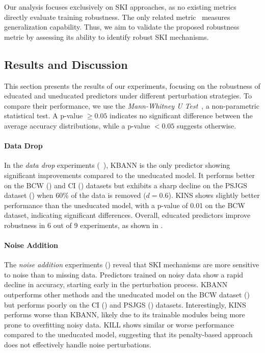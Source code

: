 %
Our analysis focuses exclusively on \gls{SKI} approaches, as no existing metrics directly evaluate training robustness.
%
The only related metric~\cite{RudenGB23} measures generalization capability.
%
Thus, we aim to validate the proposed robustness metric by assessing its ability to identify robust \gls{SKI} mechanisms.


\subsection{Results and Discussion}\label{subsec:empirical-study-on-the-robustness-of-ski-methods-results-and-discussion}
%

%
%

%
This section presents the results of our experiments, focusing on the robustness of educated and uneducated predictors under different perturbation strategies.
%
To compare their performance, we use the \emph{Mann-Whitney U Test}~\cite{Mann-Whitney2010}, a non-parametric statistical test.
%
A p-value \(\geq 0.05\) indicates no significant difference between the average accuracy distributions, while a p-value \(< 0.05\) suggests otherwise.


\paragraph{Data Drop}
%
In the \emph{data drop} experiments (~), \gls{KBANN} is the only predictor showing significant improvements compared to the uneducated model.
%
It performs better on the \gls{BCW} () and \gls{CI} () datasets but exhibits a sharp decline on the \gls{PSJGS} dataset () when 60\% of the data is removed (\(d = 0.6\)).
%
\gls{KINS} shows slightly better performance than the uneducated model, with a p-value of 0.01 on the \gls{BCW} dataset, indicating significant differences.
%
Overall, educated predictors improve robustness in 6 out of 9 experiments, as shown in .


\paragraph{Noise Addition}
%
The \emph{noise addition} experiments () reveal that \gls{SKI} mechanisms are more sensitive to noise than to missing data.
%
Predictors trained on noisy data show a rapid decline in accuracy, starting early in the perturbation process.
%
\gls{KBANN} outperforms other methods and the uneducated model on the \gls{BCW} dataset () but performs poorly on the \gls{CI} () and \gls{PSJGS} () datasets.
%
Interestingly, \gls{KINS} performs worse than \gls{KBANN}, likely due to its trainable modules being more prone to overfitting noisy data.
%
\gls{KILL} shows similar or worse performance compared to the uneducated model, suggesting that its penalty-based approach does not effectively handle noise perturbations.


